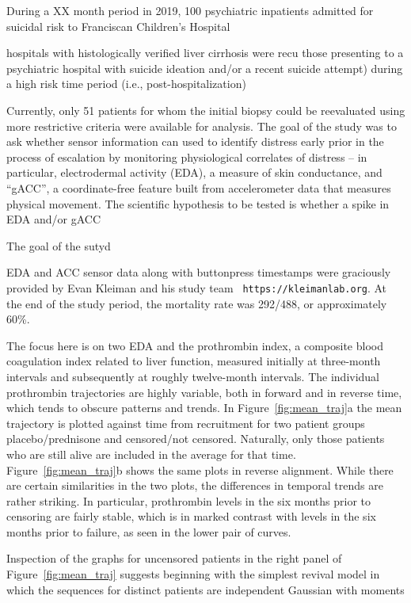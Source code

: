 \documentclass[11pt]{amsart}
\begin{document}
During a XX month period in 2019, 100 psychiatric inpatients admitted
for suicidal risk to Franciscan Children's Hospital


hospitals with histologically verified liver cirrhosis were recu
those presenting to a psychiatric hospital with suicide ideation
and/or a recent suicide attempt) during a high risk time period (i.e.,
post-hospitalization)

Currently, only 51 patients for whom the initial biopsy could be
reevaluated using more restrictive criteria were available for
analysis.
The goal of the study was to ask whether sensor information can used
to identify distress early prior in the process of escalation by
monitoring physiological correlates of distress -- in particular,
electrodermal activity (EDA), a measure of skin conductance, and
``gACC'', a coordinate-free feature built from accelerometer data
that measures physical movement.
The scientific hypothesis to be tested is whether a spike in
EDA and/or gACC

The goal of the sutyd



EDA and ACC sensor data along with buttonpress timestamps were
graciously provided by Evan Kleiman and his study team {\tt
https://kleimanlab.org}.
At the end of the study period, the mortality rate was 292/488, or
approximately 60\%.

The focus here is on two EDA and the  prothrombin index, a composite
blood coagulation index
related to liver function, measured initially at three-month intervals
and subsequently at roughly twelve-month intervals.
The individual prothrombin trajectories are highly variable,
both in forward and in reverse time,
which tends to obscure patterns and trends.
In Figure~\ref{fig:mean_traj}a the mean trajectory is plotted against time from recruitment
for two patient groups placebo/prednisone and censored/not censored.
Naturally, only those patients who are still alive are included in the average
for that time.
Figure~\ref{fig:mean_traj}b shows the same plots in reverse alignment.
While there are certain similarities in the two plots,
the differences in temporal trends are rather striking.
In particular, prothrombin levels in the six months prior to censoring are fairly stable,
which is in marked contrast with levels in the six months prior to failure,
as seen in the lower pair of curves.

Inspection of the graphs for uncensored patients in the right panel of Figure~\ref{fig:mean_traj} suggests
beginning with the simplest revival model in which the sequences
for distinct patients are independent Gaussian with moments
\end{document}
